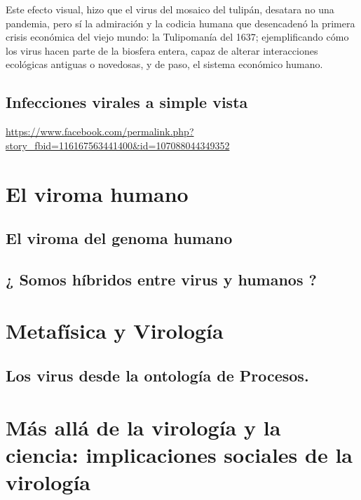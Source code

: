 \documentclass[
  spanish,
]{book}
\begin{document}
Este efecto visual, hizo que el virus del mosaico del tulipán, desatara no una pandemia, pero sí la admiración y la codicia humana que desencadenó la primera crisis económica del viejo mundo: la Tulipomanía del 1637; ejemplificando cómo los virus hacen parte de la biosfera entera, capaz de alterar interacciones ecológicas antiguas o novedosas, y de paso, el sistema económico humano.

\hypertarget{infecciones-virales-a-simple-vista}{%
\section{Infecciones virales a simple vista}\label{infecciones-virales-a-simple-vista}}

\url{https://www.facebook.com/permalink.php?story_fbid=116167563441400\&id=107088044349352}

\hypertarget{el-viroma-humano}{%
\chapter{El viroma humano}\label{el-viroma-humano}}

\hypertarget{el-viroma-del-genoma-humano}{%
\section{El viroma del genoma humano}\label{el-viroma-del-genoma-humano}}

\hypertarget{somos-huxedbridos-entre-virus-y-humanos}{%
\section{¿ Somos híbridos entre virus y humanos ?}\label{somos-huxedbridos-entre-virus-y-humanos}}

\hypertarget{metafuxedsica-y-virologuxeda}{%
\chapter{Metafísica y Virología}\label{metafuxedsica-y-virologuxeda}}

\hypertarget{los-virus-desde-la-ontologuxeda-de-procesos.}{%
\section{Los virus desde la ontología de Procesos.}\label{los-virus-desde-la-ontologuxeda-de-procesos.}}

\hypertarget{muxe1s-alluxe1-de-la-virologuxeda-y-la-ciencia-implicaciones-sociales-de-la-virologuxeda}{%
\chapter{Más allá de la virología y la ciencia: implicaciones sociales de la virología}\label{muxe1s-alluxe1-de-la-virologuxeda-y-la-ciencia-implicaciones-sociales-de-la-virologuxeda}}
\end{document}
